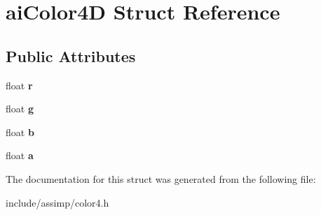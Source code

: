 \hypertarget{structaiColor4D}{\section{ai\-Color4\-D \-Struct \-Reference}
\label{structaiColor4D}
}
\subsection*{\-Public \-Attributes}
\begin{DoxyCompactItemize}
\item 
\hypertarget{structaiColor4D_a989c2117cfae5a4457fa65f0257e93c7}{float {\bfseries r}}\label{structaiColor4D_a989c2117cfae5a4457fa65f0257e93c7}

\item 
\hypertarget{structaiColor4D_a32e929c7db12fb6f79f74a611f6d8fe6}{float {\bfseries g}}\label{structaiColor4D_a32e929c7db12fb6f79f74a611f6d8fe6}

\item 
\hypertarget{structaiColor4D_ab64376fc730371f8952f5f98084b2430}{float {\bfseries b}}\label{structaiColor4D_ab64376fc730371f8952f5f98084b2430}

\item 
\hypertarget{structaiColor4D_a1bf4f719c14e844dcd7ce5a1c1969c89}{float {\bfseries a}}\label{structaiColor4D_a1bf4f719c14e844dcd7ce5a1c1969c89}

\end{DoxyCompactItemize}


\-The documentation for this struct was generated from the following file\-:\begin{DoxyCompactItemize}
\item 
include/assimp/color4.\-h\end{DoxyCompactItemize}
